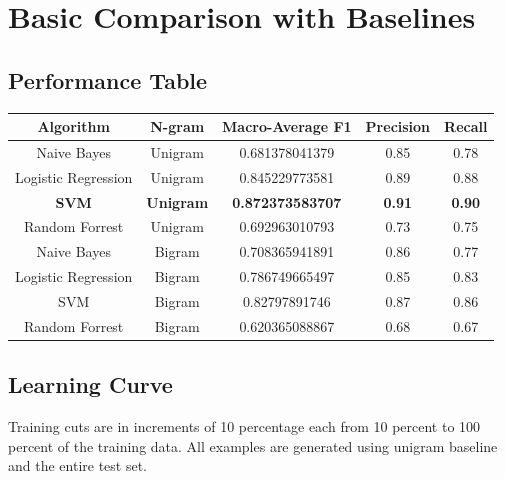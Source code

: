 \documentclass[11pt, oneside]{article}   	%
\begin{document}
\section{Basic Comparison with Baselines}
\subsection{Performance Table}
\begin{center}
 \begin{tabular}{||c c c c c||} 
 \hline
 Algorithm & N-gram & Macro-Average F1 & Precision & Recall \\ [0.5ex] 
 \hline\hline
 Naive Bayes & Unigram & 0.681378041379 & 0.85 & 0.78 \\
 Logistic Regression & Unigram & 0.845229773581 & 0.89 & 0.88 \\ 
 \textbf{SVM} &  \textbf{Unigram} &  \textbf{0.872373583707} &  \textbf{0.91} &  \textbf{0.90} \\
 Random Forrest & Unigram & 0.692963010793 & 0.73 & 0.75 \\ 
 Naive Bayes & Bigram & 0.708365941891 & 0.86 & 0.77 \\
 Logistic Regression & Bigram & 0.786749665497 & 0.85 & 0.83 \\ 
 SVM & Bigram & 0.82797891746 & 0.87 & 0.86 \\
 Random Forrest & Bigram & 0.620365088867 & 0.68 & 0.67 \\ [1ex] 
 \hline
\end{tabular}
\end{center}
\newpage

\subsection{Learning Curve}
Training cuts are in increments of 10 percentage each from 10 percent to 100 percent of the training data.  All examples are generated using unigram baseline and the entire test set.
\end{document}
